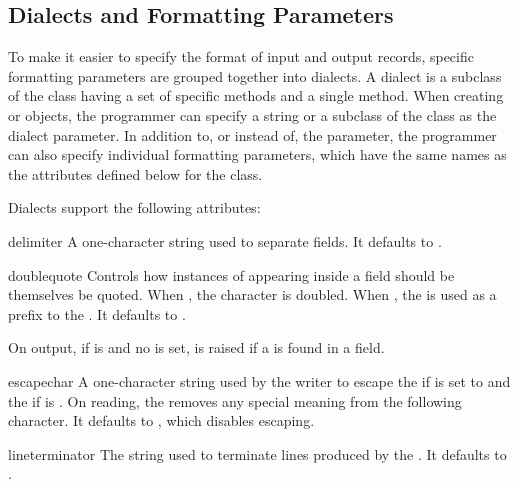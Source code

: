 \subsection{Dialects and Formatting Parameters\label{csv-fmt-params}}

To make it easier to specify the format of input and output records,
specific formatting parameters are grouped together into dialects.  A
dialect is a subclass of the  class having a set of specific
methods and a single  method.  When creating 
or  objects, the programmer can specify a string or a subclass
of the  class as the dialect parameter.  In addition to, or
instead of, the  parameter, the programmer can also specify
individual formatting parameters, which have the same names as the
attributes defined below for the  class.

Dialects support the following attributes:

\begin{memberdesc}[Dialect]{delimiter}
A one-character string used to separate fields.  It defaults to .
\end{memberdesc}

\begin{memberdesc}[Dialect]{doublequote}
Controls how instances of  appearing inside a field should
be themselves be quoted.  When , the character is doubled.
When , the  is used as a prefix to the
.  It defaults to .

On output, if  is  and no
 is set,  is raised if a 
is found in a field.
\end{memberdesc}

\begin{memberdesc}[Dialect]{escapechar}
A one-character string used by the writer to escape the  if
 is set to  and the 
if  is . On reading, the 
removes any special meaning from the following character. It defaults
to , which disables escaping.
\end{memberdesc}

\begin{memberdesc}[Dialect]{lineterminator}
The string used to terminate lines produced by the .
It defaults to . 

\end{memberdesc}

